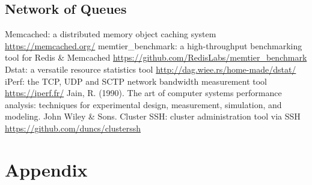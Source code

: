 \documentclass[11pt,a4paper]{article}
\begin{document}
\subsection{Network of Queues} \label{sec:network-of-queues}

\begin{thebibliography}{9}
 Memcached: a distributed memory object caching system \url{https://memcached.org/}
 memtier\_benchmark: a high-throughput benchmarking tool for Redis \& Memcached \url{https://github.com/RedisLabs/memtier\_benchmark}
 Dstat: a versatile resource statistics tool \url{http://dag.wiee.rs/home-made/dstat/}
 iPerf: the TCP, UDP and SCTP network bandwidth measurement tool \url{https://iperf.fr/}
 Jain, R. (1990). The art of computer systems performance analysis: techniques for experimental design, measurement, simulation, and modeling. John Wiley \& Sons.
 Cluster SSH: cluster administration tool via SSH \url{https://github.com/duncs/clusterssh}
\end{thebibliography}

\clearpage

\section*{Appendix} \label{sec:appendix}
\end{document}
